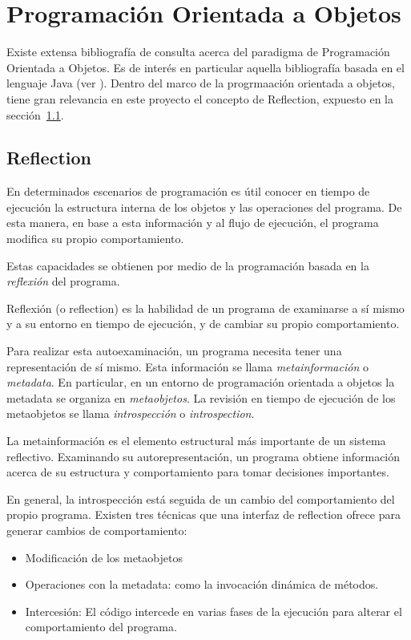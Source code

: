 \section{Programación Orientada a Objetos}

Existe extensa bibliografía de consulta acerca del paradigma de Programación
Orientada a Objetos. Es de interés en particular aquella bibliografía basada en
el lenguaje Java (ver \cite{flanagan2005java} \cite{lafore2003data}). 
Dentro del marco de la progrmaación orientada a objetos, tiene
gran relevancia en este proyecto el concepto de Reflection, expuesto en la
sección~\ref{reflection}.

\subsection{Reflection}
\label{reflection}

En determinados escenarios de programación es útil conocer en
tiempo de ejecución la estructura interna de los objetos y las operaciones del
programa. De esta manera, en base a esta información y al flujo de ejecución,
el programa modifica su propio comportamiento.

Estas capacidades se obtienen por medio de la programación basada en la
\textit{reflexión} del programa.

Reflexión (o reflection) es la habilidad de un programa de examinarse a sí
mismo y a su entorno en tiempo de ejecución, y de cambiar su propio
comportamiento.

Para realizar esta autoexaminación, un programa necesita tener una
representación de sí mismo. Esta información se llama \textit{metainformación} o
\textit{metadata}. En particular, en un entorno de programación orientada a
objetos la metadata se organiza en \textit{metaobjetos}. La
revisión en tiempo de ejecución de los metaobjetos se llama
\textit{introspección} o \textit{introspection}.
\cite{Forman04javareflection}

La metainformación es el elemento estructural más importante de un
sistema reflectivo. Examinando su autorepresentación, un programa obtiene
información acerca de su estructura y comportamiento para tomar decisiones
importantes.

En general, la introspección está seguida de un cambio del comportamiento del
propio programa. Existen tres técnicas que una interfaz de reflection ofrece
para generar cambios de comportamiento:
\begin{itemize}
    \item Modificación de los metaobjetos
    \item Operaciones con la metadata: como la invocación dinámica de métodos.
    \item Intercesión: El código intercede en varias fases de la ejecución para
    alterar el comportamiento del programa.
\end{itemize}

